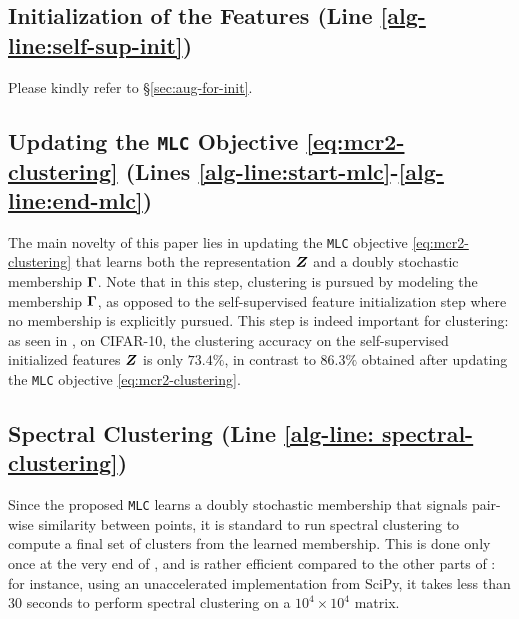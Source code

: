 \documentclass[10pt,twocolumn,letterpaper]{article}
\newcommand{\ours}{MLC}
\newcommand{\mours}{\texttt{\ours}}
\begin{document}
   
   
   \subsection{Initialization of the Features (Line \ref{alg-line:self-sup-init})}
   Please kindly refer to \S \ref{sec:aug-for-init}. 
   
   \subsection{Updating the \bf{\mours{}} Objective \eqref{eq:mcr2-clustering} (Lines \ref{alg-line:start-mlc}-\ref{alg-line:end-mlc})}
   The main novelty of this paper lies in updating the \mours{} objective \eqref{eq:mcr2-clustering} that learns both the representation ${\bm{Z}}$ and a doubly stochastic membership $\boldsymbol{\Gamma}$. Note that in this step, clustering is pursued by modeling the membership $\boldsymbol{\Gamma}$, as opposed to the self-supervised feature initialization step where no membership is explicitly pursued. This step is indeed important for clustering: as seen in , on CIFAR-10, the clustering accuracy on the self-supervised initialized features ${\bm{Z}}$ is only $73.4\%$, in contrast to $86.3\%$ obtained after updating the \mours{} objective \eqref{eq:mcr2-clustering}. 
   
   \subsection{Spectral Clustering (Line \ref{alg-line: spectral-clustering})}
   Since the proposed \mours{} learns a doubly stochastic membership that signals pair-wise similarity between points, it is standard to run spectral clustering \cite{Von_Luxburg2007-xu} to compute a final set of clusters from the learned membership. This is done only once at the very end of , and is rather efficient compared to the other parts of : for instance, using an unaccelerated implementation from SciPy, it takes less than $30$ seconds to perform spectral clustering on a $10^4\times 10^4$ matrix. 
   
\end{document}
